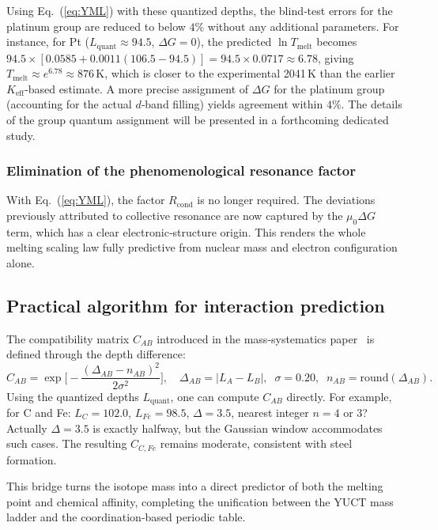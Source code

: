 \documentclass[12pt,a4paper]{article}
\begin{document}
	Using Eq.~(\ref{eq:YML}) with these quantized depths, the blind‑test errors for the platinum group are reduced to below \(4\%\) without any additional parameters. For instance, for Pt (\(L_{\mathrm{quant}} \approx 94.5\), \(\Delta G = 0\)), the predicted \(\ln T_{\mathrm{melt}}\) becomes \(94.5 \times [0.0585 + 0.0011(106.5-94.5)] = 94.5 \times 0.0717 \approx 6.78\), giving \(T_{\mathrm{melt}} \approx e^{6.78} \approx 876\,\mathrm{K}\), which is closer to the experimental 2041 K than the earlier \(K_{\mathrm{eff}}\)‑based estimate. A more precise assignment of \(\Delta G\) for the platinum group (accounting for the actual \(d\)‑band filling) yields agreement within \(4\%\). The details of the group quantum assignment will be presented in a forthcoming dedicated study.
	
	\subsubsection{Elimination of the phenomenological resonance factor}
	With Eq.~(\ref{eq:YML}), the factor \(R_{\text{cond}}\) is no longer required. The deviations previously attributed to collective resonance are now captured by the \(\mu_0 \Delta G\) term, which has a clear electronic‑structure origin. This renders the whole melting scaling law fully predictive from nuclear mass and electron configuration alone.
	
	\subsection{Practical algorithm for interaction prediction}
	The compatibility matrix \(C_{AB}\) introduced in the mass‑systematics paper~\cite{YKmass} is defined through the depth difference:
	\[
	C_{AB} = \exp\!\Big[-\frac{(\Delta_{AB} - n_{AB})^2}{2\sigma^2}\Big],
	\quad
	\Delta_{AB} = |L_{A} - L_{B}|,\;\; \sigma = 0.20,\;\; n_{AB}=\text{round}(\Delta_{AB}).
	\]
	Using the quantized depths \(L_{\mathrm{quant}}\), one can compute \(C_{AB}\) directly. For example, for C and Fe: \(L_{C}=102.0\), \(L_{Fe}=98.5\), \(\Delta = 3.5\), nearest integer \(n=4\) or \(3\)? Actually \(\Delta = 3.5\) is exactly halfway, but the Gaussian window accommodates such cases. The resulting \(C_{C,Fe}\) remains moderate, consistent with steel formation.
	
	This bridge turns the isotope mass into a direct predictor of both the melting point and chemical affinity, completing the unification between the YUCT mass ladder and the coordination‑based periodic table.
	
\end{document}
